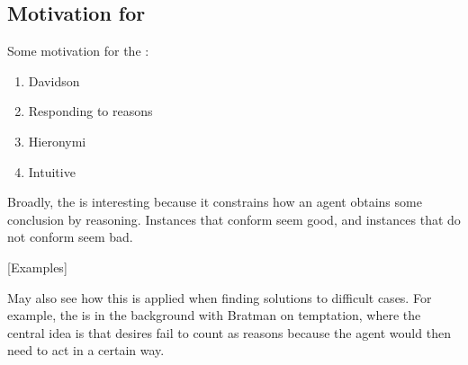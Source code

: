 \documentclass[10pt]{article}
\begin{document}
\subsection{Motivation for \mp{}}
\label{sec:motiv-main-prem}

Some motivation for the \mp{}:

\begin{enumerate}
\item Davidson
\item Responding to reasons
\item Hieronymi
\item Intuitive
\end{enumerate}

Broadly, the \mp{} is interesting because it constrains how an agent obtains some conclusion by reasoning.
Instances that conform seem good, and instances that do not conform seem bad.

[Examples]

May also see how this is applied when finding solutions to difficult cases.
For example, the \mp{} is in the background with Bratman on temptation, where the central idea is that desires fail to count as reasons because the agent would then need to act in a certain way.
\end{document}
